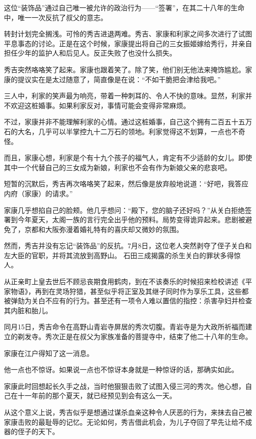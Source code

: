 \documentclass[
]{book}
\begin{document}
这位``装饰品''通过自己唯一被允许的政治行为------``签署''，在其二十八年的生命中，唯一一次反抗了叔父的意志。

转封计划完全搁浅。可怜的秀吉进退两难。秀吉、家康和利家之间多次进行了试图平息事态的讨论。正是在这个时候，家康提出将自己的三女振姬嫁给秀行，并亲自担任少年的监护人和后见人。反正失败了也没什么损失。

秀吉突然咯咯笑了起来。家康也跟着笑了。除了笑，他们别无他法来掩饰尴尬。家康的提议实在是太过随意了，简直像是在说：``不如干脆把会津给我吧。''

三人中，利家的笑声最为响亮，带着一种刺耳的、令人不快的意味。显然，利家并不欢迎这桩婚事。如果利家反对，事情可能会变得非常麻烦。

不过，家康并非不能理解利家的心情。通过这桩婚事，自己这个拥有二百五十五万石的大名，几乎可以半掌控九十二万石的领地。利家觉得这不划算，一点也不奇怪。

而且，家康心想，利家是个有十九个孩子的福气人，肯定有不少适龄的女儿。即使其中一个代替自己的三女成为新娘，利家也不会有作为新娘父亲的悲哀吧。

短暂的沉默后，秀吉再次咯咯笑了起来，然后像是放弃般地说道：``好吧，我答应内府（家康）的请求。''

家康几乎想掐自己的脸颊。他几乎想问：``殿下，您的脑子还好吗？''从关白拒绝签署到今年夏天，太阁一族的言行完全出乎他的预料。局势变得诡异起来。悲剧被避免了，京都和大阪弥漫着婚礼特有的喜庆却又微妙的氛围。

然而，秀吉并没有忘记``装饰品''的反抗。7月8日，这位老人突然剥夺了侄子关白和左大臣的官职，并将其流放到高野山。
石田三成揭露的杀生关白的罪状多得惊人。

从正亲町上皇去世后不顾忌丧期食用鹤肉，到在不该奏乐的时候招来检校讲述《平家物语》，再到在灵场狩猎，甚至似乎将正室及其继子同时作为享乐工具，这些都被弹劾为关白不应有的行为。甚至还有一项令人难以置信的指控：杀害孕妇并检查其内脏和胎儿。

同月15日，秀吉命令在高野山青岩寺屏居的秀次切腹。青岩寺是为大政所祈福而建立的剃发寺。秀次正是在叔父为家族准备的菩提寺中，结束了他二十八年的生命。

家康在江户得知了这一消息。

他一点也不惊讶。如果说一点也不惊讶本身就是一种惊讶的话，那确实如此。

家康此时回想起长久手之战，当时他狠狠击败了试图入侵三河的秀次。他心想，自己在十一年前的那个夏天，就已经预见到会有这么一天。

从这个意义上说，秀吉似乎是想通过谋杀血亲这种令人厌恶的行为，来抹去自己被家康击败的最耻辱的记忆。无论如何，秀吉借此机会，为儿子夺回了早先让给不成器的侄子的天下。
\end{document}
